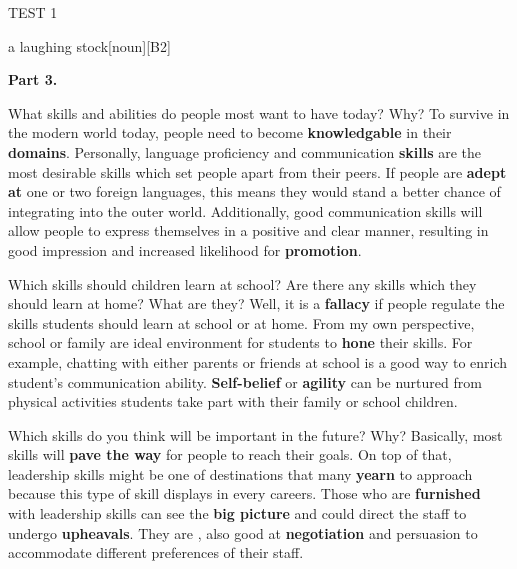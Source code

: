\begin{glossarymc}[Cambridge 10]
\begin{test}{TEST 1}
\begin{VocabExplain}[Part 2]
            \begin{ExplainCard}{a laughing stock}[noun][B2]
            \end{ExplainCard}
        \end{VocabExplain}

    \noindent
    \textbf{Part 3.}
    \begin{qa}{What skills and abilities do people most want to have today? Why?}
    To survive in the modern world today, people need to become \textbf{knowledgable} in their \textbf{domains}. Personally, language proficiency and communication \textbf{skills} are the most desirable skills which set people apart from their peers. If people are \textbf{adept at} one or two foreign languages, this means they would stand a better chance of integrating into the outer world. Additionally, good communication skills will allow people to express themselves in a positive and clear manner, resulting in good impression and increased likelihood for \textbf{promotion}.
    \end{qa}

    \begin{qa}{Which skills should children learn at school? Are there any skills which they should learn at home? What are they?}
    Well, it is a \textbf{fallacy} if people regulate the skills students should learn at school or at home. From my own perspective, school or family are ideal environment for students to \textbf{hone} their skills. For example, chatting with either parents or friends at school is a good way to enrich student's communication ability. \textbf{Self-belief} or \textbf{agility} can be nurtured from physical activities students take part with their family or school children.
    \end{qa}

    \begin{qa}{Which skills do you think will be important in the future? Why?}
    Basically, most skills will \textbf{pave the way} for people to reach their goals. On top of that, leadership skills might be one of destinations that many \textbf{yearn} to approach because this type of skill displays in every careers. Those who are \textbf{furnished} with leadership skills can see the \textbf{big picture} and could direct the staff to undergo \textbf{upheavals}. They are , also good at \textbf{negotiation} and persuasion to accommodate different preferences of their staff.
    \end{qa}


\end{test}
\end{glossarymc}
